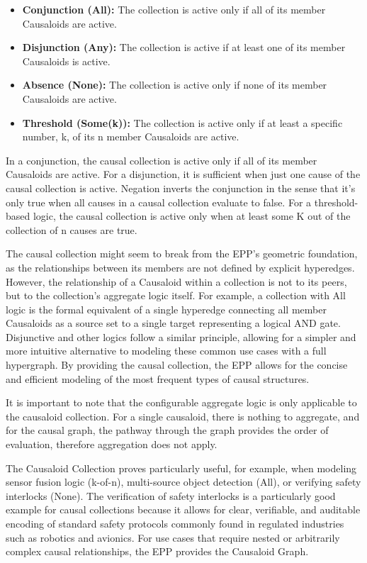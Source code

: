 \begin{itemize}
\item \textbf{Conjunction (All):} The collection is active only if all of its member Causaloids are active.
\item \textbf{Disjunction (Any):} The collection is active if at least one of its member Causaloids is active.
\item \textbf{Absence (None):} The collection is active only if none of its member Causaloids are active.
\item \textbf{Threshold (Some(k)):} The collection is active only if at least a specific number, k, of its n member Causaloids are active.
\end{itemize}

In a conjunction, the causal collection is active only if all of its member Causaloids are active. For a disjunction, it is sufficient when just one cause of the causal collection is active. Negation inverts the conjunction in the sense that it's only true when all causes in a causal collection evaluate to false. For a threshold-based logic, the causal collection is active only when at least some K out of the collection of n causes are true. 

 The causal collection might seem to break from the EPP's geometric foundation, as the relationships between its members are not defined by explicit hyperedges. However,  the relationship of a Causaloid within a collection is not to its peers, but to the collection's aggregate logic itself. For example, a collection with All logic is the formal equivalent of a single hyperedge connecting all member Causaloids as a source set to a single target representing a logical AND gate. Disjunctive and other logics follow a similar principle, allowing for a simpler and more intuitive alternative to modeling these common use cases with a full hypergraph. By providing the causal collection, the EPP allows for the concise and efficient modeling of the most frequent types of causal structures.
 
 It is important to note that the configurable aggregate logic is only applicable to the causaloid collection. For a single causaloid, there is nothing to aggregate, and for the causal graph, the pathway through the graph provides the order of evaluation, therefore aggregation does not apply. 
 
  The Causaloid Collection proves particularly useful, for example, when modeling sensor fusion logic (k-of-n), multi-source object detection (All), or verifying safety interlocks (None). The verification of safety interlocks is a particularly good example for causal collections because it allows for clear, verifiable, and auditable encoding of standard safety protocols commonly found in regulated industries such as robotics and avionics. For use cases that require nested or arbitrarily complex causal relationships, the EPP provides the Causaloid Graph.

